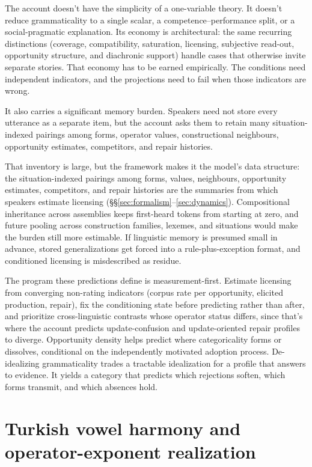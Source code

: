\documentclass[12pt,letterpaper]{article}
\begin{document}
The account doesn't have the simplicity of a one-variable theory. It doesn't reduce grammaticality to a single scalar, a competence--performance split, or a social-pragmatic explanation. Its economy is architectural: the same recurring distinctions (coverage, compatibility, saturation, licensing, subjective read-out, opportunity structure, and diachronic support) handle cases that otherwise invite separate stories. That economy has to be earned empirically. The conditions need independent indicators, and the projections need to fail when those indicators are wrong.

It also carries a significant memory burden. Speakers need not store every utterance as a separate item, but the account asks them to retain many situation-indexed pairings among forms, operator values, constructional neighbours, opportunity estimates, competitors, and repair histories.

That inventory is large, but the framework makes it the model's data structure:
the situation-indexed pairings among forms, values, neighbours, opportunity
estimates, competitors, and repair histories are the summaries from which
speakers estimate licensing (\S\S\ref{sec:formalism}--\ref{sec:dynamics}).
Compositional inheritance across assemblies keeps first-heard tokens from
starting at zero, and future pooling across construction families, lexemes, and
situations would make the burden still more estimable. If linguistic memory is
presumed small in advance, stored generalizations get forced into a
rule-plus-exception format, and conditioned licensing is misdescribed as residue.

The program these predictions define is measurement-first. Estimate licensing
from converging non-rating indicators (corpus rate per opportunity, elicited
production, repair), fix the conditioning state before predicting rather than
after, and prioritize cross-linguistic contrasts whose operator status differs,
since that's where the account predicts update-confusion and update-oriented
repair profiles to diverge. Opportunity density helps predict where
categoricality forms or dissolves, conditional on the independently motivated
adoption process. De-idealizing grammaticality trades a tractable idealization
for a profile that answers to evidence. It yields a category that predicts
which rejections soften, which forms transmit, and which absences hold.

\newpage
\appendix

\section{Turkish vowel harmony and operator-exponent realization}
\label{app:turkish-harmony}
\end{document}
